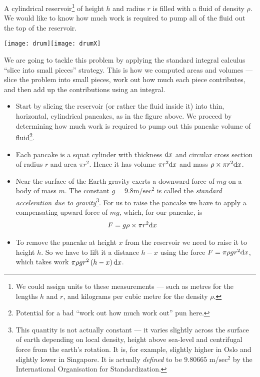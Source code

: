 \begin{eg}\label{eg:WKdrum}
A cylindrical reservoir\footnote{We could assign units to these measurements --- such as
metres for the lengths $h$ and $r$, and kilograms per cubic metre for the density $\rho$.}
of height $h$ and radius $r$ is filled with a fluid
of density $\rho$. We would like to know how much work is required to pump all of
the fluid out the top of the reservoir.
\begin{efig}
\begin{center}
   \texttt{[image: drum]}\qquad\qquad\texttt{[image: drumX]}
\end{center}
\end{efig}

\soln We are going to tackle this problem by applying the standard
integral calculus ``slice into small pieces'' strategy. This is how we computed areas and
volumes --- slice the problem into small pieces, work out how much each piece contributes,
and then add up the contributions using an integral.

\begin{itemize}
 \item Start by slicing the reservoir (or rather the fluid inside it) into thin,
horizontal, cylindrical pancakes, as in the figure above. We proceed by determining how
much work is required to pump out this pancake volume of fluid\footnote{Potential for a
bad ``work out how much work out'' pun here.}.
\item Each pancake is a squat cylinder with thickness $\mathrm{d}x$ and circular cross
section of radius $r$ and area $\pi r^2$. Hence it has volume $\pi r^2 \mathrm{d}x$ and mass
$\rho \times \pi r^2\mathrm{d}x$.
\item Near the surface of the Earth gravity exerts a downward force of
$mg$ on a body of mass $m$. The constant $g=9.8$m/$\mathrm{sec}^2$
is called the \emph{standard acceleration due to gravity}\footnote{This quantity is not
actually constant --- it varies slightly across the surface of earth depending on local
density, height above sea-level and centrifugal force from the earth's rotation. It
is, for example, slightly higher in Oslo and slightly lower in Singapore. It is
actually \emph{defined} to be $9.80665$ m/$\mathrm{sec}^2$ by the International
Organisation for Standardization.}. For us to raise the pancake we have to apply a
compensating upward force of $mg$, which, for our pancake, is
\begin{align*}
  F &= g \rho \times \pi r^2\mathrm{d}x
\end{align*}
\item To remove the pancake at height $x$ from the reservoir we need to
raise it to height $h$. So we have to lift it a distance $h-x$ using the force $F=\pi \rho
g r^2\mathrm{d}x$, which takes work $ \pi\rho g r^2\,(h-x)\, \mathrm{d}x$.


\end{itemize}
\end{eg}
